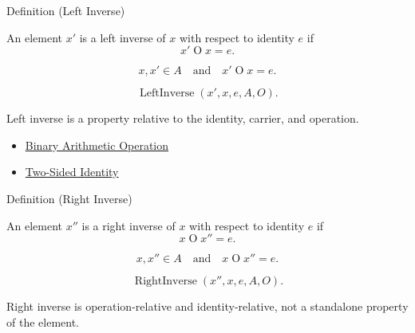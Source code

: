 \begin{definitionbox}{Definition (Left Inverse)}
\begin{definition}
\label{def:left-inverse}
An element $x'$ is a left inverse of $x$ with respect to identity $e$ if
\[
x'\mathbin{O}x=e.
\]
\end{definition}
\end{definitionbox}

\begin{remark*}
\[
x,x'\in A
\quad\text{and}\quad
x'\mathbin{O}x=e.
\]
\end{remark*}

\begin{remark*}
\[
\operatorname{LeftInverse}(x',x,e,A,O).
\]
\end{remark*}

\begin{remark*}[Interpretation]
Left inverse is a property relative to the identity, carrier, and operation.
\end{remark*}

\begin{dependencies}
\begin{itemize}
  \item \hyperref[def:binary-arithmetic-operation]{Binary Arithmetic Operation}
  \item \hyperref[def:two-sided-identity]{Two-Sided Identity}
\end{itemize}
\end{dependencies}

\begin{definitionbox}{Definition (Right Inverse)}
\begin{definition}
\label{def:right-inverse}
An element $x''$ is a right inverse of $x$ with respect to identity $e$ if
\[
x\mathbin{O}x''=e.
\]
\end{definition}
\end{definitionbox}

\begin{remark*}
\[
x,x''\in A
\quad\text{and}\quad
x\mathbin{O}x''=e.
\]
\end{remark*}

\begin{remark*}
\[
\operatorname{RightInverse}(x'',x,e,A,O).
\]
\end{remark*}

\begin{remark*}[Interpretation]
Right inverse is operation-relative and identity-relative, not a standalone
property of the element.
\end{remark*}


